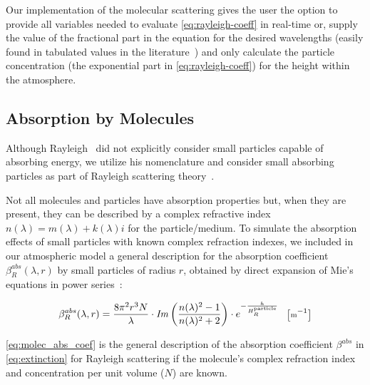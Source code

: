 \documentclass[journal]{vgtc}                %
\newcommand{\anderscomment}[1]{\textbf{[AY~} \textcolor{cyan}{#1} \textbf{~]}}
\begin{document}
Our implementation of the molecular scattering gives the user the option to provide all variables needed to evaluate \autoref{eq:rayleigh-coeff} in real-time or, supply the value of the fractional part in the equation for the desired wavelengths (easily found in tabulated values in the literature~\cite{Penndorf:1957}) and only calculate the particle concentration (the exponential part in \autoref{eq:rayleigh-coeff}) for the height within the atmosphere.\\
\vspace*{-3.5mm}

\subsection{Absorption by Molecules}

Although 
Rayleigh~\cite{Rayleigh:1871} did not explicitly consider small particles capable of absorbing energy, we utilize his nomenclature and consider small absorbing particles as part of Rayleigh scattering theory~\cite{Kerker:1978, Bohren:1983, Mishchenko:2006}.

Not all molecules and particles have absorption properties but, when they are present, they can be described by a complex refractive index $n(\lambda) = m(\lambda) + k(\lambda) i$ for the particle/medium. To simulate the absorption effects of small particles with known complex refraction indexes, we included in our atmospheric model a general description for the absorption coefficient $\beta_{R}^{abs}(\lambda, r)$ by small particles of radius $r$, obtained by direct expansion of Mie's equations in power series~\cite{Bohren:1983, Petty:2006}:

\vspace*{-3mm}
\begin{equation}\label{eq:molec_abs_coef}
\small
\beta_{R}^{abs}(\lambda, r) = \frac{8\pi^2 r^3 N}{\lambda}\cdot \mathit{Im}\left(\frac{n(\lambda)^2 - 1}{n(\lambda)^2 + 2}\right) \cdot e^{-\frac{h}{H_R^{\text{particle}}}} \quad \big[\text{m}^{-1}\big]
\end{equation}
\vspace*{-3mm}

\autoref{eq:molec_abs_coef} is the general description of the absorption coefficient $\beta^{abs}$ in \autoref{eq:extinction} for Rayleigh scattering if the molecule's complex refraction index and concentration per unit volume ($N$) are known.
\end{document}
